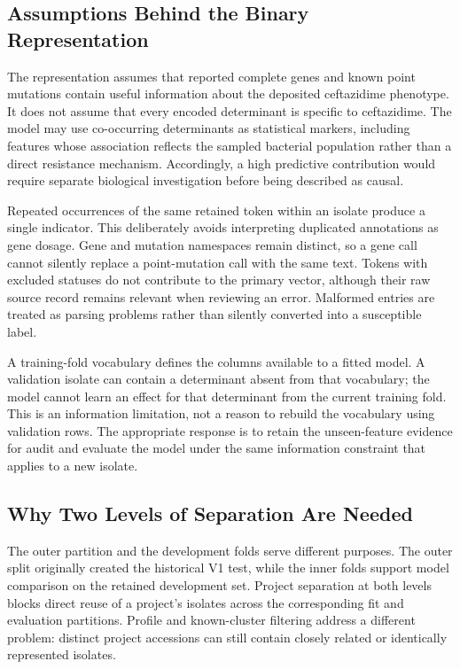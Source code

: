 \documentclass[conference]{IEEEtran}
\begin{document}
\subsection{Assumptions Behind the Binary Representation}
The representation assumes that reported complete genes and known point mutations contain useful information about the deposited ceftazidime phenotype. It does not assume that every encoded determinant is specific to ceftazidime. The model may use co-occurring determinants as statistical markers, including features whose association reflects the sampled bacterial population rather than a direct resistance mechanism. Accordingly, a high predictive contribution would require separate biological investigation before being described as causal.

Repeated occurrences of the same retained token within an isolate produce a single indicator. This deliberately avoids interpreting duplicated annotations as gene dosage. Gene and mutation namespaces remain distinct, so a gene call cannot silently replace a point-mutation call with the same text. Tokens with excluded statuses do not contribute to the primary vector, although their raw source record remains relevant when reviewing an error. Malformed entries are treated as parsing problems rather than silently converted into a susceptible label.

A training-fold vocabulary defines the columns available to a fitted model. A validation isolate can contain a determinant absent from that vocabulary; the model cannot learn an effect for that determinant from the current training fold. This is an information limitation, not a reason to rebuild the vocabulary using validation rows. The appropriate response is to retain the unseen-feature evidence for audit and evaluate the model under the same information constraint that applies to a new isolate.

\subsection{Why Two Levels of Separation Are Needed}
The outer partition and the development folds serve different purposes. The outer split originally created the historical V1 test, while the inner folds support model comparison on the retained development set. Project separation at both levels blocks direct reuse of a project's isolates across the corresponding fit and evaluation partitions. Profile and known-cluster filtering address a different problem: distinct project accessions can still contain closely related or identically represented isolates.
\end{document}
